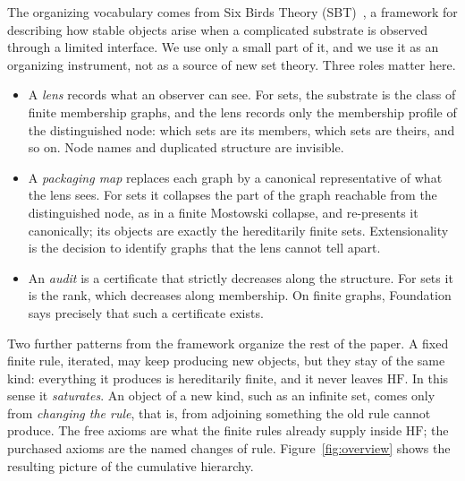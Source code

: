 \documentclass[11pt]{article}
\newcommand{\HF}{\mathrm{HF}}                 \newcommand{\rank}{\operatorname{rank}}
\theoremstyle{definition}
\begin{document}
The organizing vocabulary comes from Six Birds Theory (\textsc{SBT})~\citep{SBTFoundationsI}, a
framework for describing how stable objects arise when a complicated substrate is observed
through a limited interface. We use only a small part of it, and we use it as an organizing
instrument, not as a source of new set theory. Three roles matter here.
\begin{itemize}[itemsep=2pt,topsep=3pt]
\item A \emph{lens} records what an observer can see. For sets, the substrate is the class of
finite membership graphs, and the lens records only the membership profile of the distinguished
node: which sets are its members, which sets are theirs, and so on. Node names and duplicated
structure are invisible.
\item A \emph{packaging map} replaces each graph by a canonical representative of what the lens
sees. For sets it collapses the part of the graph reachable from the distinguished node, as in
a finite Mostowski collapse, and re-presents it canonically; its objects are exactly the
hereditarily finite sets. Extensionality is the decision to identify graphs that the lens cannot tell apart.
\item An \emph{audit} is a certificate that strictly decreases along the structure. For sets it
is the rank, which decreases along membership. On finite graphs, Foundation says precisely that
such a certificate exists.
\end{itemize}
Two further patterns from the framework organize the rest of the paper. A fixed finite rule,
iterated, may keep producing new objects, but they stay of the same kind: everything it produces
is hereditarily finite, and it never leaves $\HF$. In this sense it \emph{saturates}. An object
of a new kind, such as an infinite set, comes only from \emph{changing the rule}, that is, from
adjoining something the old rule cannot produce. The free axioms are what the finite rules
already supply inside $\HF$; the purchased axioms are the named changes of rule. Figure~\ref{fig:overview} shows the resulting picture of the cumulative
hierarchy.
\end{document}
